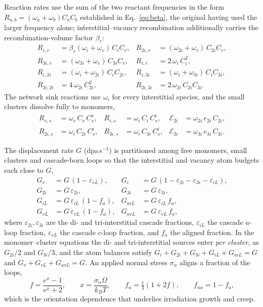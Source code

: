 \documentclass{article}
\begin{document}
Reaction rates use the sum of the two reactant frequencies in the form
$R_{a,b}=(\omega_a+\omega_b)C_aC_b$ established in Eq.~\eqref{eq:beta}, the
original having used the larger frequency alone; interstitial--vacancy
recombination additionally carries the recombination-volume factor $\beta_r$:
\begin{align}
R_{i,v}   &= \beta_r(\omega_i+\omega_v)\,C_iC_v, &
R_{2i,v}  &= (\omega_{2i}+\omega_v)\,C_{2i}C_v, \\
R_{3i,v}  &= (\omega_{3i}+\omega_v)\,C_{3i}C_v, &
R_{i,i}   &= 2\,\omega_i\,C_i^2, \\
R_{i,2i}  &= (\omega_i+\omega_{2i})\,C_iC_{2i}, &
R_{i,3i}  &= (\omega_i+\omega_{3i})\,C_iC_{3i}, \\
R_{2i,2i} &= 4\,\omega_{2i}\,C_{2i}^2, &
R_{2i,3i} &= 2\,\omega_{2i}\,C_{2i}C_{3i}.
\end{align}
The network sink reactions use $\omega_i$ for every interstitial species, and the
small clusters dissolve fully to monomers,
\begin{align}
R_{v,s}  &= \omega_v\,C_v\,C_s^v, &
R_{i,s}  &= \omega_i\,C_i\,C_s^i, &
\mathcal{E}_{2i}&=\omega_{2i}\,e_{2i}\,C_{2i},\\
R_{2i,s} &= \omega_i\,C_{2i}\,C_s^i, &
R_{3i,s} &= \omega_i\,C_{3i}\,C_s^i, &
\mathcal{E}_{3i}&=\omega_{3i}\,e_{3i}\,C_{3i}.
\end{align}

The displacement rate $G$ (dpa\,s$^{-1}$) is partitioned among free monomers,
small clusters and cascade-born loops so that the interstitial and vacancy atom
budgets each close to $G$,
\begin{align}
G_v   &= G\,(1-\varepsilon_{vL}), &
G_i   &= G\,(1-\varepsilon_{2i}-\varepsilon_{3i}-\varepsilon_{iL}),\\
G_{2i}&= G\,\varepsilon_{2i}, &
G_{3i}&= G\,\varepsilon_{3i},\\
G_{iL}&= G\,\varepsilon_{iL}\,(1-f_a), &
G_{aiL}&= G\,\varepsilon_{iL}\,f_a,\\
G_{vL}&= G\,\varepsilon_{vL}\,(1-f_a), &
G_{avL}&= G\,\varepsilon_{vL}\,f_a,
\end{align}
where $\varepsilon_{2i},\varepsilon_{3i}$ are the di- and tri-interstitial cascade
fractions, $\varepsilon_{iL}$ the cascade $a$-loop fraction, $\varepsilon_{vL}$ the
cascade $c$-loop fraction, and $f_a$ the aligned fraction. In the monomer--cluster
equations the di- and tri-interstitial sources enter \emph{per cluster}, as
$G_{2i}/2$ and $G_{3i}/3$, and the atom balances satisfy
$G_i+G_{2i}+G_{3i}+G_{iL}+G_{aiL}=G$ and $G_v+G_{vL}+G_{avL}=G$. An applied normal
stress $\sigma_n$ aligns a fraction of the loops,
\begin{equation}
f=\frac{e^{x}-1}{e^{x}+2},\qquad x=\frac{\sigma_n\Omega}{k_BT},
\qquad
f_a=\tfrac{1}{3}(1+2f),\qquad f_{na}=1-f_a,
\label{eq:falign}
\end{equation}
which is the orientation dependence that underlies irradiation growth and creep.
\end{document}
